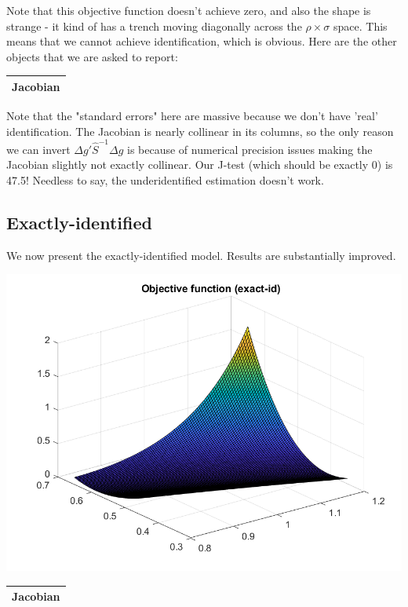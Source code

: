 \documentclass[11pt]{article} %
\begin{document}
Note that this objective function doesn't achieve zero, and also the shape is strange - it kind of has a trench moving diagonally across the $\rho \times \sigma$ space. This means that we cannot achieve identification, which is obvious. Here are the other objects that we are asked to report:

\begin{center}


\begin{tabular}{cc}
\hline
\multicolumn{2}{c}{Jacobian} \\
\hline

\hline
\end{tabular}
\end{center}

Note that the "standard errors" here are massive because we don't have 'real' identification. The Jacobian is nearly collinear in its columns, so the only reason we can invert $\Delta g ' \hat{S}^{-1} \Delta g$ is because of numerical precision issues making the Jacobian slightly not exactly collinear. Our J-test (which should be exactly 0) is 47.5! Needless to say, the underidentified estimation doesn't work.

\subsection{Exactly-identified}

We now present the exactly-identified model. Results are substantially improved.

\includegraphics{obj_ex}

\begin{center}


\begin{tabular}{cc}
\hline
\multicolumn{2}{c}{Jacobian} \\
\hline

\hline
\end{tabular}
\end{center}
\end{document}
